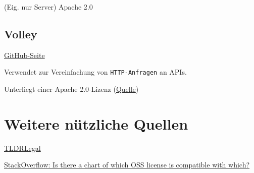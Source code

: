 \documentclass[11pt]{article} %
\begin{document}
(Eig. nur Server) Apache 2.0

\subsection{Volley}

\begin{cptitemize} 
	\item \href{https://github.com/google/volley}{GitHub-Seite}
 	 \item Verwendet zur Vereinfachung von \lstinline$HTTP-Anfragen$ an APIs.
	\item Unterliegt einer Apache 2.0-Lizenz (\href{https://github.com/google/volley/blob/master/LICENSE}{Quelle})
\end{cptitemize} 	


\section{Weitere nützliche Quellen}
\begin{cptitemize} 
 	 \item \href{https://tldrlegal.com/license/apache-license-2.0-(apache-2.0)}{TLDRLegal}
 	 \item \href{https://stackoverflow.com/questions/1978511/is-there-a-chart-of-which-oss-license-is-compatible-with-which#1978524}{StackOverflow: Is there a chart of which OSS license is compatible with which?}
\end{cptitemize} 
\end{document}

